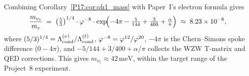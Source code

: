 \begin{remark}
\label{P17:rem:mnu_me_ratio}
Combining Corollary~\ref{P17:cor:qh1_mass} with Paper~I's electron formula gives
\begin{equation}
  \frac{m_{\nu_1}}{m_e}
  \;=\; \left(\tfrac{5}{3}\right)^{1/4}\cdot\varphi^{-8}\cdot
        \exp\!\Bigl(-4\pi-\tfrac{5}{144}+\tfrac{3}{400}+\tfrac{\alpha}{\pi}\Bigr)
  \;\approx\; 8.23\times10^{-8},
  \label{P17:eq:mnu_me_complete}
\end{equation}
where $(5/3)^{1/4}=\Lambda_{\mathrm{cond}}^{(\nu)}/\Lambda_{\mathrm{cond}}^{(\ell)}$, $\varphi^{-8}=\varphi^{12}/\varphi^{20}$,
$-4\pi$ is the Chern--Simons spoke difference ($0-4\pi$), and
$-5/144+3/400+\alpha/\pi$ collects the WZW T-matrix and QED corrections.
This gives $m_{\nu_1}\approx42\,\mathrm{meV}$, within the target range
of the Project~8 experiment.
\end{remark}

